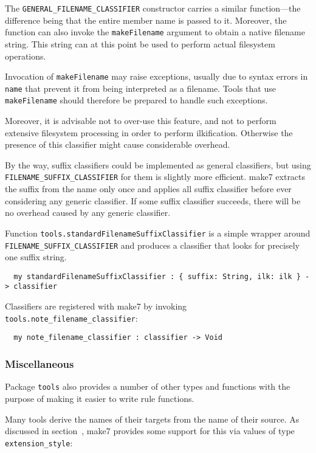 The {\tt GENERAL\_FILENAME\_CLASSIFIER} constructor carries a similar function---the
difference being that the entire member name is passed to it.
Moreover, the function can also invoke the {\tt makeFilename} argument to
obtain a native filename string.  This string can at this point be
used to perform actual filesystem operations.

Invocation of {\tt makeFilename} may raise exceptions, usually due to
syntax errors in {\tt name} that prevent it from being interpreted as
a filename.  Tools that use {\tt makeFilename} should therefore be prepared
to handle such exceptions.

Moreover, it is advisable not to over-use this feature, and not to
perform extensive filesystem processing in order to perform
ilkification.  Otherwise the presence of this classifier might cause
considerable overhead.

By the way, suffix classifiers could be implemented as general
classifiers, but using {\tt FILENAME\_SUFFIX\_CLASSIFIER} for them is slightly more
efficient.  make7 extracts the suffix from the name only once and applies
all suffix classifier before ever considering any generic classifier.
If some suffix classifier succeeds, there will be no overhead caused
by any generic classifier.

Function {\tt tools.standardFilenameSuffixClassifier} is a simple wrapper around {\tt
FILENAME\_SUFFIX\_CLASSIFIER} and produces a classifier that looks for precisely
one suffix string.

\begin{verbatim}
  my standardFilenameSuffixClassifier : { suffix: String, ilk: ilk } -> classifier
\end{verbatim}

Classifiers are registered with make7 by invoking {\tt
tools.note_filename_classifier}:

\begin{verbatim}
  my note_filename_classifier : classifier -> Void
\end{verbatim}

\subsubsection{Miscellaneous}

Package {\tt tools} also provides a number of other types and
functions with the purpose of making it easier to write rule
functions.

 Many tools derive the names of
their targets from the name of their source.  As discussed in
section~, make7 provides some support for this via
values of type {\tt extension_style}:

